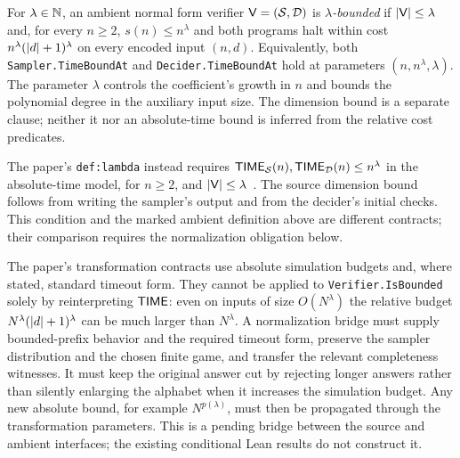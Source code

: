 \begin{definition}
\label{def:lambda-bounded}
\leanok
For $\lambda\in\mathbb{N}$, an ambient normal form verifier $\mathsf{V}=(\mathcal{S},\mathcal{D})$
is \emph{$\lambda$-bounded} if $\left\vert {\mathsf{V}} \right\vert\leq\lambda$ and, for every $n\geq2$,
$s(n)\leq n^\lambda$ and both programs halt within cost
$n^\lambda(\left\vert {d} \right\vert+1)^\lambda$ on every encoded input $(n,d)$. Equivalently, both
\texttt{Sampler.TimeBoundAt} and \texttt{Decider.TimeBoundAt} hold at parameters
$(n,n^\lambda,\lambda)$. The parameter $\lambda$ controls
the coefficient's growth in $n$ and bounds the polynomial degree in the auxiliary input
size. The dimension bound is a separate clause; neither it nor an absolute-time bound
is inferred from the relative cost predicates.
\end{definition}

\begin{remark}
\label{rem:source-lambda-bounded}
The paper's \texttt{def:lambda} instead requires
$\mathsf{TIME}_{\mathcal{S}}(n),\mathsf{TIME}_{\mathcal{D}}(n)\leq n^\lambda$ in the absolute-time model,
for $n\geq2$, and $\left\vert {\mathsf{V}} \right\vert\leq\lambda$~\cite{AuditSync26}. The source dimension
bound follows from writing the sampler's output and from the decider's initial checks.
This condition and the marked ambient definition above are different contracts; their
comparison requires the normalization obligation below.
\end{remark}

\begin{remark}
\label{rem:runtime-contract-bridge}
The paper's transformation contracts use absolute simulation budgets and, where stated,
standard timeout form. They cannot be applied to \texttt{Verifier.IsBounded} solely by
reinterpreting $\mathsf{TIME}$: even on inputs of size $O(N^\lambda)$ the relative budget
$N^\lambda(\left\vert {d} \right\vert+1)^\lambda$ can be much larger than $N^\lambda$. A normalization
bridge must supply bounded-prefix behavior and the required timeout form, preserve the
sampler distribution and the chosen finite game, and transfer the relevant completeness
witnesses. It must keep the original answer cut by rejecting longer answers rather than
silently enlarging the alphabet when it increases the simulation budget. Any new absolute
bound, for example $N^{p(\lambda)}$, must then be propagated through the transformation
parameters. This is a pending bridge between the source and ambient interfaces; the
existing conditional Lean results do not construct it.
\end{remark}

